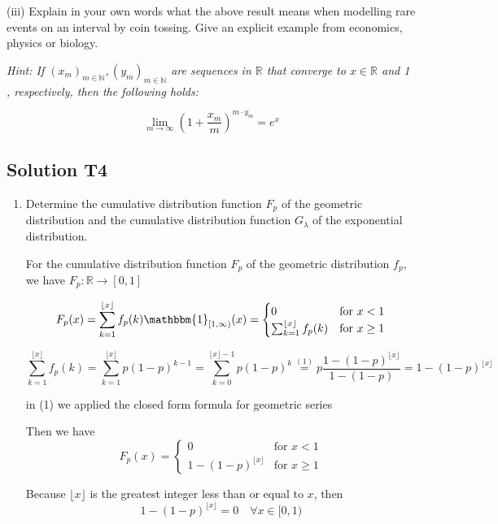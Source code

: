 \documentclass[12pt]{article}
\begin{document}
(iii) Explain in your own words what the above result means when modelling rare events on an interval by coin tossing. Give an explicit example from economics, physics or biology.

\textit{
Hint: If $\left(x_{m}\right)_{m \in \mathbb{N}},\left(y_{m}\right)_{m \in \mathbb{N}}$ are sequences in $\mathbb{R}$ that converge to $x \in \mathbb{R}$ and 1 , respectively, then the following holds:
}

$$
\lim _{m \rightarrow \infty}\left(1+\frac{x_{m}}{m}\right)^{m \cdot y_{m}}=e^{x}
$$


\subsection*{Solution T4}   

\begin{enumerate}
    \item Determine the cumulative distribution function $F_{p}$ of the geometric distribution and the cumulative distribution function $G_{\lambda}$ of the exponential distribution.
    

    For the cumulative distribution function $F_p$ of the geometric distribution $f_p$, we have $F_p: \mathbb{R} \rightarrow [0,1]$

    \[
    F_p(x)=\sum_{k=1}^{\lfloor x \rfloor} f_p(k) \mathbbm{1}_{[1, \infty)}(x)= 
    \begin{cases}
        0 & \text{for } x<1\\
        \sum_{k=1}^{\lfloor x \rfloor} f_p(k)  & \text{for } x \geq 1
    \end{cases} 
    \]

\[
    \sum_{k=1}^{\lfloor x \rfloor} f_p(k) = \sum_{k=1}^{\lfloor x \rfloor} p(1-p)^{k-1} = \sum_{k=0}^{\lfloor x \rfloor-1} p(1-p)^{k}    \stackrel{(1)}{=} p \frac{1-(1-p)^{\lfloor x \rfloor}}{1-(1-p)} = 1-(1-p)^{\lfloor x \rfloor}
\]

{\footnotesize in (1) we applied the closed form formula for geometric series}

Then we have
\[
    F_p(x)= 
    \begin{cases}
        0 & \text{for } x<1\\
        1-(1-p)^{\lfloor x \rfloor}  & \text{for } x \geq 1
    \end{cases} 
    \]

Because $\lfloor x \rfloor$ is the greatest integer less than or equal to $x$, then
\[
    1-(1-p)^{\lfloor x \rfloor} =0 \quad \forall x \in [0,1)
\]


\end{enumerate}
\end{document}
